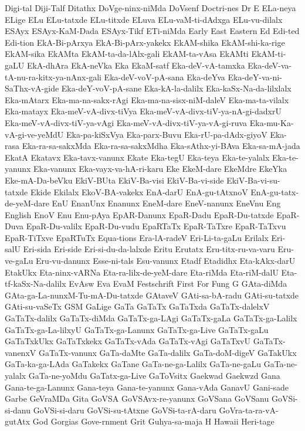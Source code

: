{Digi-tal
Diji-Talf
Ditathx
DoVge-ninx-niMda
DoVsenf
Doctri-nes
Dr
E
ELa-neya
ELige
ELu
ELu-tatxde
ELu-titxde
ELuva
ELu-vaM-ti-dAdxga
ELu-vu-dilalx
ESAyx
ESAyx-KaM-Dada
ESAyx-Tikf
ETi-niMda
Early
East
Eastern
Ed
Edi-ted
Edi-tion
EkA-Bi-pArxya
EkA-Bi-pArx-yakekx
EkAM-shika
EkAM-shi-ka-rige
EkAM-sika
EkAMta
EkAM-ta-da-lAlx-gali
EkAM-ta-vAsa
EkAMti
EkAM-ti-gaLU
EkA-dhAra
EkA-neVka
Eka
EkaM-satf
Eka-deV-vA-tamxka
Eka-deV-va-tA-nu-ra-kitx-ya-nAnx-gali
Eka-deV-voV-pA-sana
Eka-deYva
Eka-deY-va-ni-SaThx-vA-gide
Eka-deY-voV-pA-sane
Eka-kA-la-dalilx
Eka-kaSx-Na-da-lilxlalx
Eka-mAtarx
Eka-ma-na-sakx-rAgi
Eka-ma-na-sisx-niM-daleV
Eka-ma-ta-vilalx
Eka-matayx
Eka-meV-vA-divx-tiVya
Eka-meV-vA-divx-tiV-ya-nA-gi-dadxrU
Eka-meV-vA-divx-tiV-ya-vAgi
Eka-meV-vA-divx-tiV-ya-vA-gi-ruva
Eka-mu-Ka-vA-gi-ve-yeMdU
Eka-pa-kiSxVya
Eka-parx-Buvu
Eka-rU-pa-dAdx-giyoV
Eka-rasa
Eka-ra-sa-sakxMda
Eka-ra-sa-sakxMdha
Eka-sAthx-yi-BAva
Eka-sa-mA-jada
EkatA
Ekatavx
Eka-tavx-vanunx
Ekate
Eka-tegU
Eka-teya
Eka-te-yalalx
Eka-te-yanunx
Eka-vanunx
Eka-vayx-va-hA-ri-karu
Eke
EkeM-dare
EkeMdre
EkeYka
Eke-mA-Da-beVku
EkiV-BUta
EkiV-Ba-visi
EkiV-Ba-vi-side
EkiV-Ba-vi-su-tatxde
Ekide
Ekilalx
EkoV-BA-vakekx
EnA-darU
EnA-gu-tAtxnoV
EnA-gu-tatx-de-yeM-dare
EnU
EnanUnx
Enanunx
EneM-dare
EneV-nanunx
EneVnu
Eng
English
EnoV
Enu
Enu-pAya
EpAR-Danunx
EpaR-Dadu
EpaR-Du-tatxde
EpaR-Duva
EpaR-Du-valilx
EpaR-Du-vudu
EpaRTaTx
EpaR-TaTxre
EpaR-TaTxvu
EpaR-TiTxve
EpaRTuTx
Equa-tions
Era-lA-radeV
Eri-Li-ta-gaLu
Erilalx
Eri-salU
Eri-sida
Eri-side
Eri-si-du-da-lalxde
Eritu
Erutatx
Eru-titx-ru-va-varu
Eru-ve-gaLu
Eru-vu-danunx
Esse-ni-tals
Esu-vanunx
Etadf
Etadidhx
Eta-kAkx-darU
EtakUkx
Eta-ninx-vARNa
Eta-ra-lilx-de-yeM-dare
Eta-riMda
Eta-riM-dalU
Eta-tf-kaSx-Na-dalilx
EvAsw
Eva
EvaM
Festschrift
First
For
Fung
G
GAta-diMda
GAta-ga-La-nunxM-Tu-mA-Du-tatxde
GAtaveV
GAti-sa-bA-radu
GAti-su-tatxde
GAti-su-vaSeTx
GSM
GaLige
GaTa
GaTaTx
GaTaTxda
GaTaTx-dalelxV
GaTaTx-dalilx
GaTaTx-diMda
GaTaTx-ga-LAgi
GaTaTx-gaLa
GaTaTx-ga-Lalilx
GaTaTx-ga-La-lilxyU
GaTaTx-ga-Lanunx
GaTaTx-ga-Live
GaTaTx-gaLu
GaTaTxkUkx
GaTaTxkekx
GaTaTx-vAda
GaTaTx-vAgi
GaTaTxvU
GaTaTx-vanenxV
GaTaTx-vanunx
GaTa-daMte
GaTa-dalilx
GaTa-doM-digeV
GaTakUkx
GaTa-ka-ga-LAda
GaTakekx
GaTane
GaTa-ne-ga-Lalilx
GaTa-ne-gaLu
GaTa-ne-yalalx
GaTa-ne-yoMdu
GaTatx-ga-Live
GaToVsitx
Gaekwad
Gaekwzd
Gana
Gana-te-ga-Lanunx
Gana-teya
Gana-te-yanunx
Gana-vAda
GanavU
Gani-sade
Garbe
GeVraMDa
Gita
GoVSA
GoVSAvx-re-yanunx
GoVSana
GoVSanu
GoVSi-si-danu
GoVSi-si-daru
GoVSi-su-tAtxne
GoVSi-ta-rA-daru
GoVra-ta-ra-vA-gutAtx
God
Gorgias
Gove-rnment
Grit
Guhya-sa-maja
H
Hawaii
Heri-tage
}
